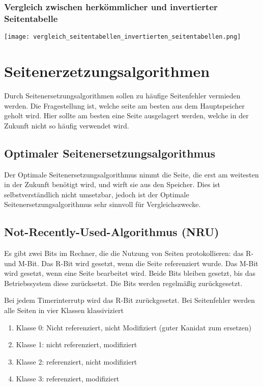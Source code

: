 \subsubsection*{Vergleich zwischen herkömmlicher und invertierter Seitentabelle}

\texttt{[image: vergleich\_seitentabellen\_invertierten\_seitentabellen.png]}

\section{Seitenerzetzungsalgorithmen}

Durch Seitenersetzungsalgorithmen sollen zu häufige Seitenfehler vermieden
werden. Die Fragestellung ist, welche seite am besten aus dem Hauptspeicher
geholt wird. Hier sollte am besten eine Seite ausgelagert werden, welche in der
Zukunft nicht so häufig verwendet wird.

\subsection{Optimaler Seitenersetzungsalgorithmus}

Der Optimale Seitenersetzungsalgorithmus nimmt die Seite, die erst am weitesten
in der Zukunft benötigt wird, und wirft sie aus den Speicher. Dies ist
selbstverständlich nicht umsetzbar, jedoch ist der Optimale
Seitenersetzungsalgorithmus sehr sinnvoll für Vergleichszwecke.

\subsection{Not-Recently-Used-Algorithmus (NRU)}

Es gibt zwei Bits im Rechner, die die Nutzung von Seiten protokollieren: das R-
und M-Bit. Das R-Bit wird gesetzt, wenn die Seite referenziert wurde. Das M-Bit
wird gesetzt, wenn eine Seite bearbeitet wird. Beide Bits bleiben gesetzt, bis
das Betriebssystem diese zurücksetzt. Die Bits werden regelmäßig zurückgesetzt.

Bei jedem Timerinterrutp wird das R-Bit zurückgesetzt. Bei Seitenfehler werden
alle Seiten in vier Klassen klassiviziert

\begin{enumerate}
    \item Klasse 0: Nicht referenziert, nicht Modifiziert (guter Kanidat zum ersetzen)
    \item Klasse 1: nicht referenziert, modifiziert
    \item Klasse 2: referenziert, nicht modifiziert
    \item Klasse 3: referenziert, modifiziert
\end{enumerate}

